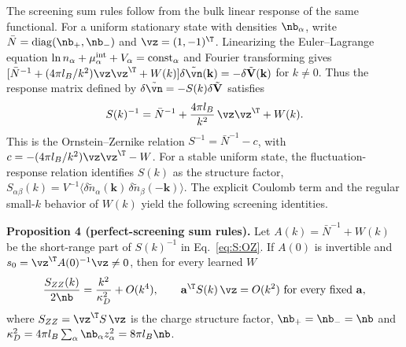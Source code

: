 The screening sum rules follow from the bulk linear response of the same functional. For a uniform stationary state with densities $\nb_\alpha$, write $\bar N={\rm diag}(\nb_+,\nb_-)$ and $\vz=(1,-1)^{\T}$. Linearizing the Euler--Lagrange equation $\ln n_\alpha+\mu^{\rm int}_\alpha+V_\alpha={\rm const}_\alpha$ and Fourier transforming gives $[\bar N^{-1}+(4\pi l_B/k^2)\vz\vz^{\T}+W(k)]\delta\tilde{\vn}(\mathbf k)=-\delta\tilde{\mathbf V}(\mathbf k)$ for $k\neq0$. Thus the response matrix defined by $\delta\tilde{\vn}=-S(k)\delta\tilde{\mathbf V}$ satisfies
\begin{equation}
S(k)^{-1}=\bar N^{-1}+\frac{4\pi l_B}{k^2}\,\vz\vz^{\T}+W(k).
\label{eq:S:OZ}
\end{equation}
This is the Ornstein--Zernike relation $S^{-1}=\bar N^{-1}-c$, with $c=-(4\pi l_B/k^2)\vz\vz^{\T}-W$. For a stable uniform state, the fluctuation-response relation identifies $S(k)$ as the structure factor, $S_{\alpha\beta}(k)=V^{-1}\langle\delta\tilde n_\alpha(\mathbf k)\,\delta\tilde n_\beta(-\mathbf k)\rangle$. The explicit Coulomb term and the regular small-$k$ behavior of $W(k)$ yield the following screening identities.

\textbf{Proposition 4 (perfect-screening sum rules).} Let $A(k)=\bar N^{-1}+W(k)$ be the short-range part of $S(k)^{-1}$ in Eq.~\ref{eq:S:OZ}. If $A(0)$ is invertible and $s_0=\vz^{\T}A(0)^{-1}\vz\neq0$, then for every learned $W$
\begin{equation}
\frac{S_{ZZ}(k)}{2\nb}=\frac{k^2}{\kappa_D^2}+O(k^4),\qquad \mathbf a^{\T}S(k)\,\vz=O(k^2)\ \text{for every fixed }\mathbf a,
\end{equation}
where $S_{ZZ}=\vz^{\T}S\,\vz$ is the charge structure factor, $\nb_+=\nb_-=\nb$ and $\kappa_D^2=4\pi l_B\sum_\alpha\nb_\alpha z_\alpha^2=8\pi l_B\nb$.

